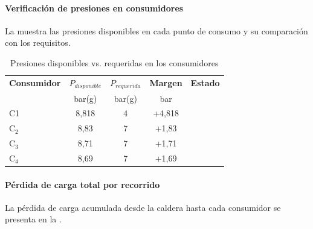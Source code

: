 \documentclass[12pt]{article}
\begin{document}
\paragraph{Verificación de presiones en consumidores}

La  muestra las presiones disponibles en cada punto de consumo y su comparación con los requisitos.

\begin{table}[H]
	\centering
	\caption{Presiones disponibles vs. requeridas en los consumidores}
	\label{tab:presiones-consumidores}
	\begin{tabular}{lcccc}
		\toprule
		\textbf{Consumidor} & \textbf{$P_{disponible}$} & \textbf{$P_{requerida}$} & \textbf{Margen} & \textbf{Estado} \\
		                    & bar(g)                    & bar(g)                   & bar             &                 \\
		\midrule
		C1               & 8{,}818                   & 4                        & +4{,}818        & \checkmark      \\
		C$_2$               & 8{,}83                    & 7                        & +1{,}83         & \checkmark      \\
		C$_3$               & 8{,}71                    & 7                        & +1{,}71         & \checkmark      \\
		C$_4$               & 8{,}69                    & 7                        & +1{,}69         & \checkmark      \\
		\bottomrule
	\end{tabular}
\end{table}

\paragraph{Pérdida de carga total por recorrido}

La pérdida de carga acumulada desde la caldera hasta cada consumidor se presenta en la .
\end{document}
